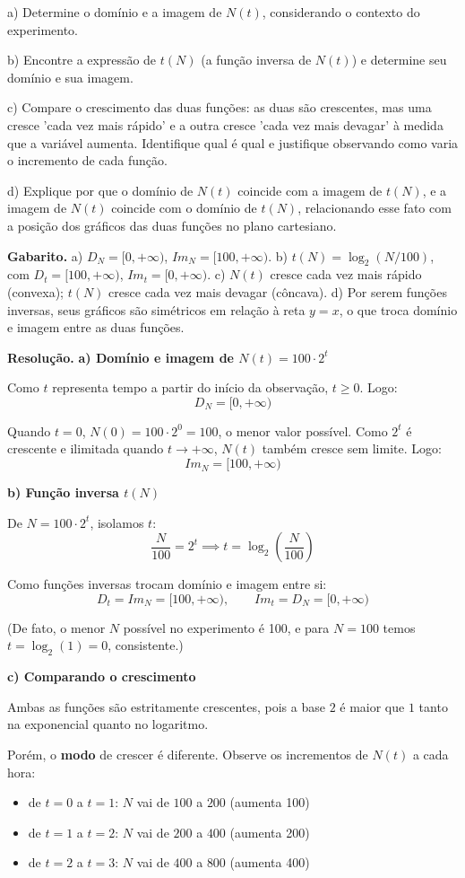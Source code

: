 a) Determine o domínio e a imagem de $N(t)$, considerando o contexto do experimento.

b) Encontre a expressão de $t(N)$ (a função inversa de $N(t)$) e determine seu domínio e sua imagem.

c) Compare o crescimento das duas funções: as duas são crescentes, mas uma cresce 'cada vez mais rápido' e a outra cresce 'cada vez mais devagar' à medida que a variável aumenta. Identifique qual é qual e justifique observando como varia o incremento de cada função.

d) Explique por que o domínio de $N(t)$ coincide com a imagem de $t(N)$, e a imagem de $N(t)$ coincide com o domínio de $t(N)$, relacionando esse fato com a posição dos gráficos das duas funções no plano cartesiano.

\textbf{Gabarito.} a) $D_N=[0,+\infty)$, $Im_N=[100,+\infty)$. b) $t(N)=\log_2(N/100)$, com $D_t=[100,+\infty)$, $Im_t=[0,+\infty)$. c) $N(t)$ cresce cada vez mais rápido (convexa); $t(N)$ cresce cada vez mais devagar (côncava). d) Por serem funções inversas, seus gráficos são simétricos em relação à reta $y=x$, o que troca domínio e imagem entre as duas funções.

\textbf{Resolução.} \textbf{a) Domínio e imagem de $N(t) = 100\cdot 2^t$}

Como $t$ representa tempo a partir do início da observação, $t \geq 0$. Logo:
$$D_N = [0, +\infty)$$

Quando $t=0$, $N(0) = 100 \cdot 2^0 = 100$, o menor valor possível. Como $2^t$ é crescente e ilimitada quando $t \to +\infty$, $N(t)$ também cresce sem limite. Logo:
$$Im_N = [100, +\infty)$$

\textbf{b) Função inversa $t(N)$}

De $N = 100\cdot 2^t$, isolamos $t$:
$$\frac{N}{100} = 2^t \implies t = \log_2\left(\frac{N}{100}\right)$$

Como funções inversas trocam domínio e imagem entre si:
$$D_t = Im_N = [100, +\infty), \qquad Im_t = D_N = [0, +\infty)$$

(De fato, o menor $N$ possível no experimento é 100, e para $N=100$ temos $t=\log_2(1)=0$, consistente.)

\textbf{c) Comparando o crescimento}

Ambas as funções são estritamente crescentes, pois a base $2$ é maior que $1$ tanto na exponencial quanto no logaritmo.

Porém, o \textbf{modo} de crescer é diferente. Observe os incrementos de $N(t)$ a cada hora:
\begin{itemize}[nosep,leftmargin=*]
\item de $t=0$ a $t=1$: $N$ vai de $100$ a $200$ (aumenta 100)
\item de $t=1$ a $t=2$: $N$ vai de $200$ a $400$ (aumenta 200)
\item de $t=2$ a $t=3$: $N$ vai de $400$ a $800$ (aumenta 400)
\end{itemize}


